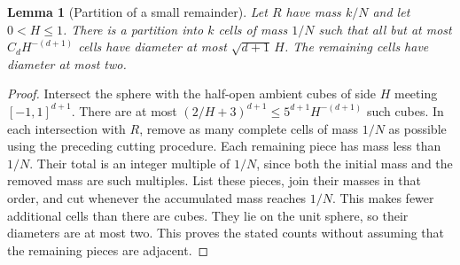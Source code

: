 \documentclass[11pt,a4paper]{article}
\newtheorem{lemma}[theorem]{Lemma}
\theoremstyle{definition}
\numberwithin{equation}{section}
\begin{document}
\begin{lemma}[Partition of a small remainder]\label{lem:pool}
Let $R$ have mass $k/N$ and let $0<H\le1$. There is a partition into $k$ cells of mass $1/N$ such that all but at most $C_dH^{-(d+1)}$ cells have diameter at most $\sqrt{d+1}\,H$. The remaining cells have diameter at most two.
\end{lemma}
\begin{proof}
Intersect the sphere with the half-open ambient cubes of side $H$ meeting $[-1,1]^{d+1}$. There are at most $(2/H+3)^{d+1}\le5^{d+1}H^{-(d+1)}$ such cubes. In each intersection with $R$, remove as many complete cells of mass $1/N$ as possible using the preceding cutting procedure. Each remaining piece has mass less than $1/N$. Their total is an integer multiple of $1/N$, since both the initial mass and the removed mass are such multiples. List these pieces, join their masses in that order, and cut whenever the accumulated mass reaches $1/N$. This makes fewer additional cells than there are cubes. They lie on the unit sphere, so their diameters are at most two. This proves the stated counts without assuming that the remaining pieces are adjacent.
\end{proof}
\end{document}
